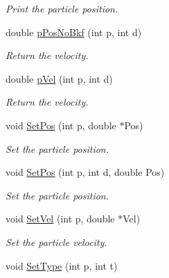 \begin{DoxyCompactItemize}
\begin{DoxyCompactList}\small\item\em \-Print the particle position. \end{DoxyCompactList}\item 
\hypertarget{classVarData_a24a0a89ff0f65b56c0f30a6949d56449}{double \hyperlink{classVarData_a24a0a89ff0f65b56c0f30a6949d56449}{p\-Pos\-No\-Bkf} (int p, int d)}\label{classVarData_a24a0a89ff0f65b56c0f30a6949d56449}

\begin{DoxyCompactList}\small\item\em \-Return the velocity. \end{DoxyCompactList}\item 
\hypertarget{classVarData_af437e6050bc54d9934ce8e41d4e14af0}{double \hyperlink{classVarData_af437e6050bc54d9934ce8e41d4e14af0}{p\-Vel} (int p, int d)}\label{classVarData_af437e6050bc54d9934ce8e41d4e14af0}

\begin{DoxyCompactList}\small\item\em \-Return the velocity. \end{DoxyCompactList}\item 
\hypertarget{classVarData_a5b8f787336ad1a776f82be0a59c9f570}{void \hyperlink{classVarData_a5b8f787336ad1a776f82be0a59c9f570}{\-Set\-Pos} (int p, double $\ast$\-Pos)}\label{classVarData_a5b8f787336ad1a776f82be0a59c9f570}

\begin{DoxyCompactList}\small\item\em \-Set the particle position. \end{DoxyCompactList}\item 
\hypertarget{classVarData_a4138dc5653572cfd0e241d4a20da623c}{void \hyperlink{classVarData_a4138dc5653572cfd0e241d4a20da623c}{\-Set\-Pos} (int p, int d, double \-Pos)}\label{classVarData_a4138dc5653572cfd0e241d4a20da623c}

\begin{DoxyCompactList}\small\item\em \-Set the particle position. \end{DoxyCompactList}\item 
\hypertarget{classVarData_ae8d1cbd45a41409d2a76e73738003744}{void \hyperlink{classVarData_ae8d1cbd45a41409d2a76e73738003744}{\-Set\-Vel} (int p, double $\ast$\-Vel)}\label{classVarData_ae8d1cbd45a41409d2a76e73738003744}

\begin{DoxyCompactList}\small\item\em \-Set the particle velocity. \end{DoxyCompactList}\item 
\hypertarget{classVarData_a54f680d04a52452baf2d8e9852c425cd}{void \hyperlink{classVarData_a54f680d04a52452baf2d8e9852c425cd}{\-Set\-Type} (int p, int t)}\label{classVarData_a54f680d04a52452baf2d8e9852c425cd}


\end{DoxyCompactItemize}
